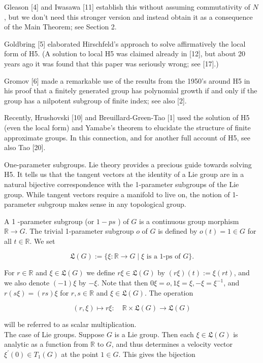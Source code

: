 \documentclass[10pt]{article}
\begin{document}
Gleason [4] and Iwasawa [11] establish this without assuming commutativity of $N$, but we don't need this stronger version and instead obtain it as a consequence of the Main Theorem; see Section 2.

Goldbring [5] elaborated Hirschfeld's approach to solve affirmatively the local form of H5. (A solution to local H5 was claimed already in [12], but about 20 years ago it was found that this paper was seriously wrong; see [17].)

Gromov [6] made a remarkable use of the results from the 1950's around H5 in his proof that a finitely generated group has polynomial growth if and only if the group has a nilpotent subgroup of finite index; see also [2].

Recently, Hrushovski [10] and Breuillard-Green-Tao [1] used the solution of H5 (even the local form) and Yamabe's theorem to elucidate the structure of finite approximate groups. In this connection, and for another full account of H5, see also Tao [20].

One-parameter subgroups. Lie theory provides a precious guide towards solving H5. It tells us that the tangent vectors at the identity of a Lie group are in a natural bijective correspondence with the 1-parameter subgroups of the Lie group. While tangent vectors require a manifold to live on, the notion of 1-parameter subgroup makes sense in any topological group.

A 1 -parameter subgroup (or $1-p s$ ) of $G$ is a continuous group morphism $\mathbb{R} \rightarrow G$. The trivial 1-parameter subgroup $o$ of $G$ is defined by $o(t)=1 \in G$ for all $t \in \mathbb{R}$. We set

$$
\mathfrak{L}(G):=\{\xi: \mathbb{R} \rightarrow G \mid \xi \text { is a } 1 \text {-ps of } G\} .
$$

For $r \in \mathbb{R}$ and $\xi \in \mathfrak{L}(G)$ we define $r \xi \in \mathfrak{L}(G)$ by $(r \xi)(t):=\xi(r t)$, and we also denote $(-1) \xi$ by $-\xi$. Note that then $0 \xi=o, 1 \xi=\xi,-\xi=\xi^{-1}$, and $r(s \xi)=(r s) \xi$ for $r, s \in \mathbb{R}$ and $\xi \in \mathfrak{L}(G)$. The operation

$$
(r, \xi) \mapsto r \xi: \quad \mathbb{R} \times \mathfrak{L}(G) \rightarrow \mathfrak{L}(G)
$$

will be referred to as scalar multiplication.\\
The case of Lie groups. Suppose $G$ is a Lie group. Then each $\xi \in \mathfrak{L}(G)$ is analytic as a function from $\mathbb{R}$ to $G$, and thus determines a velocity vector $\xi^{\prime}(0) \in T_{1}(G)$ at the point $1 \in G$. This gives the bijection
\end{document}
